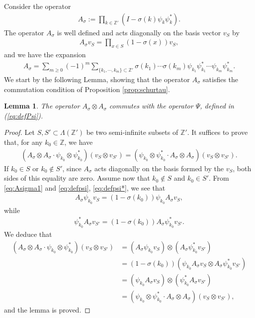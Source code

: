 \documentclass[12pt]{amsart}
\newtheorem{lem}[thm]{Lemma}
\theoremstyle{definition}
\newcommand{\Z}{\mathbb{Z}}
\begin{document}
Consider the operator
\begin{align*}
A_\sigma := \prod_{ k \in \Z'} (I-\sigma(k) \psi_k \psi_k^*). 
\end{align*}
The operator $A_\sigma$ is well defined and acts diagonally on the basis vector $v_S$ by
\begin{align} \label{eq:Asigma1}
    A_\sigma v_S = \prod_{x \in S} (1- \sigma(x)) v_S,
\end{align}
and we have the expansion
\begin{align} \label{eq:Asigmaexpansion}
    A_\sigma = \sum_{m \geq 0} (-1)^m \sum_{\{k_1, \cdots , k_m\} \subset \Z'} \sigma(k_1) \cdots \sigma(k_m)\psi_{k_1}\psi_{k_1}^* \cdots \psi_{k_m} \psi_{k_m}^*.
\end{align}
We start by the following Lemma, showing that the operator $A_\sigma$ satisfies the commutation condition of Proposition \ref{prop:schurtau}.
\begin{lem} \label{lem:commutation}
The operator $A_\sigma \otimes A_\sigma$ commutes with the operator $\Psi$, defined in (\ref{eq:defPsi}).
\end{lem}
\begin{proof}
Let $S,S' \subset \Lambda(\Z')$ be two semi-infinite subsets of $\Z'$. It suffices to prove that, for any $k_0 \in \Z$, we have
\begin{align*}
    (A_\sigma\otimes A_\sigma \cdot\psi_{k_0} \otimes \psi_{k_0}^*)(v_S \otimes v_{S'})=(\psi_{k_0}\otimes \psi_{k_0}^*\cdot A_\sigma\otimes A_\sigma) (v_S \otimes v_{S'} ).
\end{align*}
If $k_0 \in S$ or $k_0 \notin S'$, since $A_\sigma$ acts diagonally on the basis formed by the $v_S$, both sides of this equality are zero. Assume now that $k_0 \notin S$ and $k_0 \in S'$. From \eqref{eq:Asigma1} and \eqref{eq:defpsi}, \eqref{eq:defpsi*}, we see that
\begin{align*}
    A_\sigma\psi_{k_0}v_S=(1-\sigma(k_0))\psi_{k_0} A_\sigma v_S,
\end{align*}
while
\begin{align*}
    \psi_{k_0}^* A_\sigma v_{S'}=(1-\sigma(k_0))A_\sigma \psi_{k_0}^* v_{S'}.
\end{align*}
We deduce that
\begin{align*}
  (A_\sigma\otimes A_\sigma \cdot\psi_{k_0} \otimes \psi_{k_0}^*)(v_S \otimes v_{S'})&=(A_\sigma \psi_{k_0} v_S) \otimes (A_\sigma \psi_{k_0}^* v_{S'}) \\
  &=(1-\sigma(k_0)) (\psi_{k_0} A_\sigma v_S \otimes A_\sigma\psi_{k_0}^*v_{S'}) \\
  &=(\psi_{k_0} A_\sigma v_S )\otimes (\psi_{k_0}^*A_{\sigma} v_{S'}) \\
  &=(\psi_{k_0}\otimes \psi_{k_0}^*\cdot A_\sigma\otimes A_\sigma) (v_S \otimes v_{S'} ),
\end{align*}
and the lemma is proved.
\end{proof}
\end{document}

